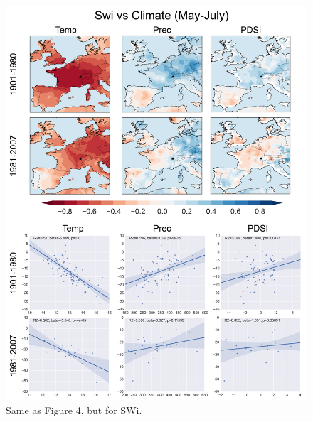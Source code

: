 \documentclass[12pt]{article}
\begin{document}
\begin{figure}
\center
\includegraphics[width=.9\columnwidth,scale=2]{SUPP_fig_11_SWi_MJJ_climate_onedeg.png}
\caption{Same as Figure 4, but for SWi.}
\end{figure}
\end{document}
